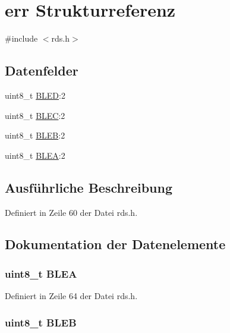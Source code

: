 \hypertarget{structerr}{}\section{err Strukturreferenz}
\label{structerr}


{\ttfamily \#include $<$rds.\+h$>$}

\subsection*{Datenfelder}
\begin{DoxyCompactItemize}
\item 
uint8\+\_\+t \hyperlink{structerr_a3498d51c8fc84119a00242f7bb9b6719}{B\+L\+E\+D}\+:2
\item 
uint8\+\_\+t \hyperlink{structerr_a279b7213c9f5034e0fa7aa8d9c2bc9a2}{B\+L\+E\+C}\+:2
\item 
uint8\+\_\+t \hyperlink{structerr_aadd978be8508790bbf25c9a488ea553c}{B\+L\+E\+B}\+:2
\item 
uint8\+\_\+t \hyperlink{structerr_a22256b3ddf2070027c87504d1de20c2f}{B\+L\+E\+A}\+:2
\end{DoxyCompactItemize}


\subsection{Ausführliche Beschreibung}


Definiert in Zeile 60 der Datei rds.\+h.



\subsection{Dokumentation der Datenelemente}
\hypertarget{structerr_a22256b3ddf2070027c87504d1de20c2f}{}
\subsubsection[{B\+L\+E\+A}]{\setlength{\rightskip}{0pt plus 5cm}uint8\+\_\+t B\+L\+E\+A}\label{structerr_a22256b3ddf2070027c87504d1de20c2f}


Definiert in Zeile 64 der Datei rds.\+h.

\hypertarget{structerr_aadd978be8508790bbf25c9a488ea553c}{}
\subsubsection[{B\+L\+E\+B}]{\setlength{\rightskip}{0pt plus 5cm}uint8\+\_\+t B\+L\+E\+B}\label{structerr_aadd978be8508790bbf25c9a488ea553c}


